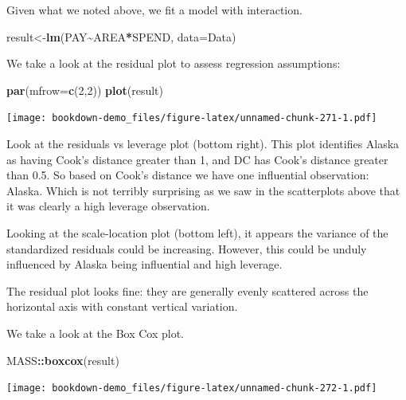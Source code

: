\documentclass[
]{book}
\newenvironment{Shaded}{\begin{snugshade}}{\end{snugshade}}
\newcommand{\AttributeTok}[1]{\textcolor[rgb]{0.13,0.29,0.53}{#1}}
\newcommand{\DecValTok}[1]{\textcolor[rgb]{0.00,0.00,0.81}{#1}}
\newcommand{\FunctionTok}[1]{\textcolor[rgb]{0.13,0.29,0.53}{\textbf{#1}}}
\newcommand{\NormalTok}[1]{#1}
\newcommand{\OtherTok}[1]{\textcolor[rgb]{0.56,0.35,0.01}{#1}}
\newcommand{\SpecialCharTok}[1]{\textcolor[rgb]{0.81,0.36,0.00}{\textbf{#1}}}
\begin{document}
Given what we noted above, we fit a model with interaction.

\begin{Shaded}
\begin{Highlighting}[]
\NormalTok{result}\OtherTok{\textless{}{-}}\FunctionTok{lm}\NormalTok{(PAY}\SpecialCharTok{\textasciitilde{}}\NormalTok{AREA}\SpecialCharTok{*}\NormalTok{SPEND, }\AttributeTok{data=}\NormalTok{Data)}
\end{Highlighting}
\end{Shaded}

We take a look at the residual plot to assess regression assumptions:

\begin{Shaded}
\begin{Highlighting}[]
\FunctionTok{par}\NormalTok{(}\AttributeTok{mfrow=}\FunctionTok{c}\NormalTok{(}\DecValTok{2}\NormalTok{,}\DecValTok{2}\NormalTok{))}
\FunctionTok{plot}\NormalTok{(result)}
\end{Highlighting}
\end{Shaded}

\texttt{[image: bookdown-demo\_files/figure-latex/unnamed-chunk-271-1.pdf]}

Look at the residuals vs leverage plot (bottom right). This plot identifies Alaska as having Cook's distance greater than 1, and DC has Cook's distance greater than 0.5. So based on Cook's distance we have one influential observation: Alaska. Which is not terribly surprising as we saw in the scatterplots above that it was clearly a high leverage observation.

Looking at the scale-location plot (bottom left), it appears the variance of the standardized residuals could be increasing. However, this could be unduly influenced by Alaska being influential and high leverage.

The residual plot looks fine: they are generally evenly scattered across the horizontal axis with constant vertical variation.

We take a look at the Box Cox plot.

\begin{Shaded}
\begin{Highlighting}[]
\NormalTok{MASS}\SpecialCharTok{::}\FunctionTok{boxcox}\NormalTok{(result) }
\end{Highlighting}
\end{Shaded}

\texttt{[image: bookdown-demo\_files/figure-latex/unnamed-chunk-272-1.pdf]}
\end{document}
